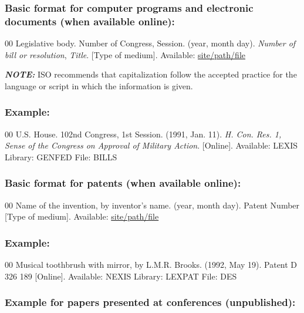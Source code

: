 \documentclass{ieeeojpel}
\begin{document}
\subsubsection*{Basic format for computer programs and electronic documents (when available online): }

\begin{thebibliography}{00}
 Legislative body. Number of Congress, Session. (year, month day). \textit{Number of bill or resolution}, \textit{Title}. [Type
of medium]. Available: \underline{site/path/file}
\end{thebibliography}

{\bfseries\itshape NOTE:} ISO recommends that capitalization follow the
accepted practice for the language or script in which the information is
given.

\subsubsection*{Example:}

\begin{thebibliography}{00}
 U.S. House. 102nd Congress, 1st Session. (1991, Jan. 11). \textit{H. Con. Res. 1, Sense of the Congress on Approval of Military Action}. [Online]. Available: LEXIS Library: GENFED File: BILLS
\end{thebibliography}

\subsubsection*{Basic format for patents (when available online):}

\begin{thebibliography}{00}
 Name of the invention, by inventor's name. (year, month day). Patent Number [Type
of medium]. Available: \underline{site/path/file}
\end{thebibliography}

\subsubsection*{Example:}

\begin{thebibliography}{00}
 Musical toothbrush with mirror, by L.M.R. Brooks. (1992, May 19). Patent D 326 189 [Online]. Available: NEXIS Library: LEXPAT File: DES
\end{thebibliography}

\subsubsection*{Example for papers presented at conferences (unpublished):}
\end{document}

